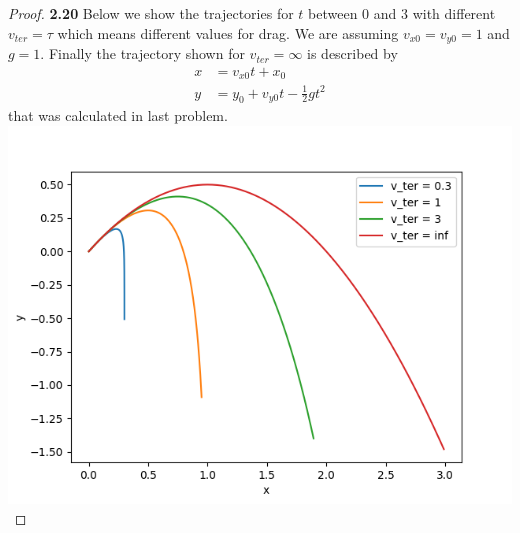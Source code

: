 \documentclass[11pt]{article}
\theoremstyle{definition}
\begin{document}
    \begin{proof}{\textbf{2.20}}
        Below we show the trajectories for $t$ between 0 and 3 with different
        $v_{ter} = \tau$ which means different values for drag. We are
        assuming $v_{x0} = v_{y0} = 1$ and $g = 1$. Finally the trajectory
        shown for $v_{ter} = \infty$ is described by
        \begin{align*}
            x &= v_{x0}t + x_0\\
            y &= y_0 + v_{y0}t - \frac{1}{2}gt^2
        \end{align*}
        that was calculated in last problem.\\
        \includegraphics{taylor-2.20.png}
    \end{proof}
\end{document}
